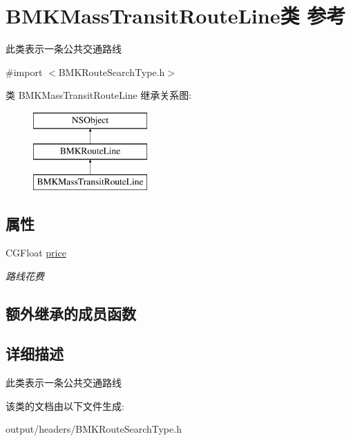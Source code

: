 \hypertarget{interface_b_m_k_mass_transit_route_line}{}\section{B\+M\+K\+Mass\+Transit\+Route\+Line类 参考}
\label{interface_b_m_k_mass_transit_route_line}


此类表示一条公共交通路线  




{\ttfamily \#import $<$B\+M\+K\+Route\+Search\+Type.\+h$>$}

类 B\+M\+K\+Mass\+Transit\+Route\+Line 继承关系图\+:\begin{figure}[H]
\begin{center}
\leavevmode
\includegraphics[height=3.000000cm]{interface_b_m_k_mass_transit_route_line}
\end{center}
\end{figure}
\subsection*{属性}
\begin{DoxyCompactItemize}
\item 
\hypertarget{interface_b_m_k_mass_transit_route_line_ace1c0308bacc0af5ee1bab5993703254}{}C\+G\+Float \hyperlink{interface_b_m_k_mass_transit_route_line_ace1c0308bacc0af5ee1bab5993703254}{price}\label{interface_b_m_k_mass_transit_route_line_ace1c0308bacc0af5ee1bab5993703254}

\begin{DoxyCompactList}\small\item\em 路线花费 \end{DoxyCompactList}\end{DoxyCompactItemize}
\subsection*{额外继承的成员函数}


\subsection{详细描述}
此类表示一条公共交通路线 

该类的文档由以下文件生成\+:\begin{DoxyCompactItemize}
\item 
output/headers/B\+M\+K\+Route\+Search\+Type.\+h\end{DoxyCompactItemize}
